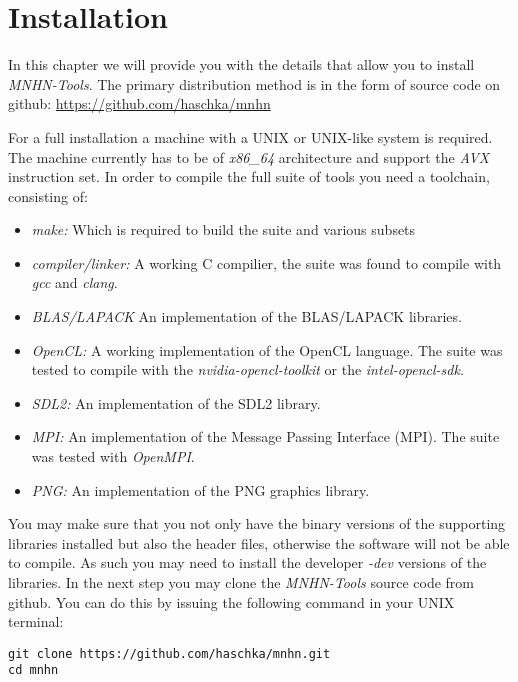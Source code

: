 \chapter{Installation}

In this chapter we will provide you with the details that allow you to
install \emph{MNHN-Tools}. The primary distribution method is in the
form of source code on github: \newline
\url{https://github.com/haschka/mnhn} \newline

For a full installation a machine with a UNIX or UNIX-like system
is required. The machine currently has to be of \emph{x86\_64}
architecture and support the \emph{AVX} instruction set. In order to
compile the full suite of tools you need a toolchain, consisting of:
\begin{itemize}
\item \emph{make:} Which is required to build the suite and various subsets
\item \emph{compiler/linker:} A working C compilier, the suite was found to
  compile with \emph{gcc} and \emph{clang}.
\item \emph{BLAS/LAPACK} An implementation of the BLAS/LAPACK
  libraries.
\item \emph{OpenCL:} A working implementation of the OpenCL
  language. The suite was tested to compile with the
  \emph{nvidia-opencl-toolkit} or the \emph{intel-opencl-sdk}.
\item \emph{SDL2:} An implementation of the SDL2 library.
\item \emph{MPI:} An implementation of the Message Passing Interface
  (MPI). The suite was tested with \emph{OpenMPI}.
\item \emph{PNG:} An implementation of the PNG graphics library.
\end{itemize}
You may make sure that you not only have the binary versions of the
supporting libraries installed but also the header files, otherwise
the software will not be able to compile. As such you may need to
install the developer \emph{-dev} versions of the libraries. In the
next step you may clone the \emph{MNHN-Tools} source code from github.
You can do this by issuing the following command in your UNIX
terminal:
\begin{lstlisting}                                                              
git clone https://github.com/haschka/mnhn.git
cd mnhn
\end{lstlisting}

